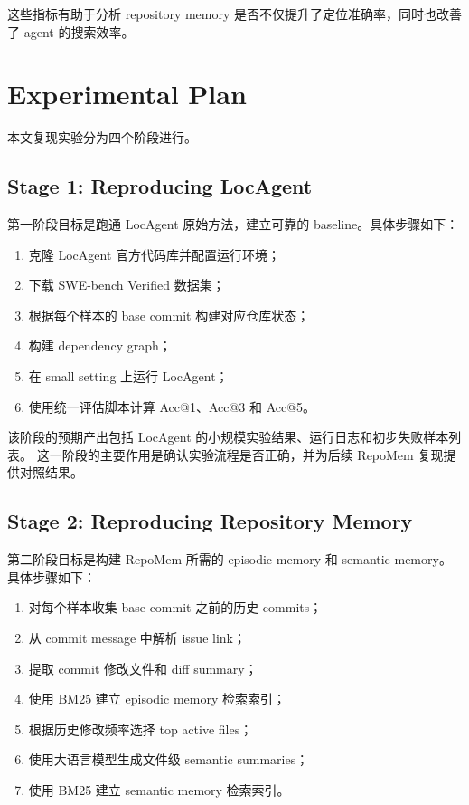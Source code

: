 这些指标有助于分析 repository memory 是否不仅提升了定位准确率，同时也改善了 agent 的搜索效率。

\section{Experimental Plan}
\label{sec:experimental_plan}

本文复现实验分为四个阶段进行。

\subsection{Stage 1: Reproducing LocAgent}
\label{subsec:stage1}

第一阶段目标是跑通 LocAgent 原始方法，建立可靠的 baseline。具体步骤如下：

\begin{enumerate}
    \item 克隆 LocAgent 官方代码库并配置运行环境；
    \item 下载 SWE-bench Verified 数据集；
    \item 根据每个样本的 base commit 构建对应仓库状态；
    \item 构建 dependency graph；
    \item 在 small setting 上运行 LocAgent；
    \item 使用统一评估脚本计算 Acc@1、Acc@3 和 Acc@5。
\end{enumerate}

该阶段的预期产出包括 LocAgent 的小规模实验结果、运行日志和初步失败样本列表。
这一阶段的主要作用是确认实验流程是否正确，并为后续 RepoMem 复现提供对照结果。

\subsection{Stage 2: Reproducing Repository Memory}
\label{subsec:stage2}

第二阶段目标是构建 RepoMem 所需的 episodic memory 和 semantic memory。
具体步骤如下：

\begin{enumerate}
    \item 对每个样本收集 base commit 之前的历史 commits；
    \item 从 commit message 中解析 issue link；
    \item 提取 commit 修改文件和 diff summary；
    \item 使用 BM25 建立 episodic memory 检索索引；
    \item 根据历史修改频率选择 top active files；
    \item 使用大语言模型生成文件级 semantic summaries；
    \item 使用 BM25 建立 semantic memory 检索索引。
\end{enumerate}

